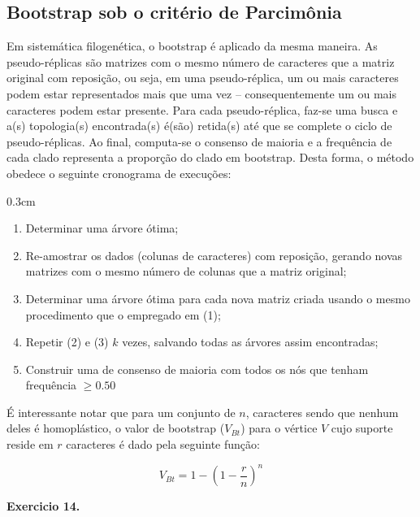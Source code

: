 \begin{refsection}
\subsection{Bootstrap sob o critério de Parcimônia}\label{tut14:boots:pars}

Em sistemática filogenética, o bootstrap é aplicado da mesma maneira. As pseudo-réplicas são matrizes com o mesmo número de caracteres que a matriz original com reposição, ou seja, em uma pseudo-réplica, um ou mais caracteres podem estar representados mais que uma vez -- consequentemente um ou mais caracteres podem estar presente. Para cada pseudo-réplica, faz-se uma busca e a(s) topologia(s) encontrada(s) é(são) retida(s) até que se complete o ciclo de pseudo-réplicas. Ao final, computa-se o consenso de maioria e a frequência de cada clado representa a proporção do clado em bootstrap. Desta forma, o método obedece o seguinte cronograma de execuções:


\begin {myindentpar}{0.3cm}
\begin{enumerate}[1.]
\item Determinar uma árvore ótima;
\item Re-amostrar os dados (colunas de caracteres) com reposição, gerando novas matrizes com o mesmo número de colunas que a matriz original;
\item Determinar uma árvore ótima para cada nova matriz criada usando o mesmo procedimento que o empregado em (1);
\item Repetir (2) e (3) $k$ vezes, salvando todas as árvores assim encontradas;
\item Construir uma de consenso de maioria com todos os nós que tenham frequência $\geq 0.50$
\end{enumerate}
\end{myindentpar}

É interessante notar que para um conjunto de $n$, caracteres sendo que nenhum deles é homoplástico, o valor de bootstrap ($V_{Bt}$) para o vértice $V$ cujo suporte reside em $r$ caracteres é dado pela seguinte função:

\begin{center}
\begin{equation}\label{eq:vbt}
V_{Bt}=1-(1-\dfrac{r}{n})^n
\end{equation}
\end{center}


\begin{blackBlock}{\textbf{Exercicio 14.}}\label{tut14:ex:14.1}


\end{blackBlock}
\end{refsection}
